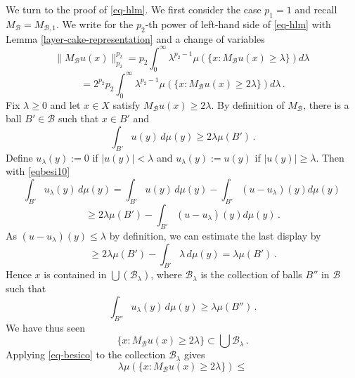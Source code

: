 {We turn to the proof of \eqref{eq-hlm}. We first consider the case $p_1=1$ and recall $M_{\mathcal{B}}=M_{\mathcal{B},1}$.
We write for the $p_2$-th power of left-hand side of \eqref{eq-hlm}
with Lemma \ref{layer-cake-representation}
and a change of variables
\begin{equation}
    \|M_{\mathcal{B}}u(x)\|_{p_2}^{p_2}
   =p_2\int _0^{\infty}
    \lambda^{p_2-1} \mu(\{x: M_{\mathcal{B}}u(x)\ge \lambda\}) d\lambda\,
\end{equation}
\begin{equation} \label{eqbesi11}
   =2^{p_2} p_2\int _0^{\infty}
    \lambda^{p_2-1} \mu(\{x: M_{\mathcal{B}}u(x)\ge 2\lambda\}) d\lambda\, .
\end{equation}
Fix $\lambda\ge 0$ and let $x\in X$ satisfy $M_{\mathcal{B}}u(x)\ge 2\lambda$. By definition of $M_{\mathcal{B}}$, there is a ball
$B'\in \mathcal{B}$ such that
$x\in B'$ and
\begin{equation}\label{eqbesi10}
\int_{B'} u(y)\, d\mu(y)\ge 2\lambda \mu({B'})   \, .
\end{equation}
Define
$u_\lambda(y):=0$ if $|u(y)|<\lambda$ and $u_\lambda(y):=u(y)$ if $|u(y)|\ge \lambda$.
Then with \eqref{eqbesi10}
\begin{equation}
\int_{B'} u_\lambda (y)\, d\mu(y)
=\int_{B'} u (y)\, d\mu(y)-
\int_{B'} (u-u_\lambda) (y) d\mu(y)\,
\end{equation}
\begin{equation}
\ge 2\lambda \mu({B'})-
\int_{B'} (u-u_\lambda) (y) d\mu(y)\, .
\end{equation}
As $(u-u_\lambda)(y)\le \lambda$
by definition, we can estimate the last display by
\begin{equation}
\ge 2\lambda \mu({B'})-
\int_{B'} \lambda \,  d\mu(y)
=\lambda \mu({B'})\, .
\end{equation}
Hence $x$ is contained in
$\bigcup(\mathcal{B}_\lambda)$,
where $\mathcal{B}_\lambda$
is the collection of balls $B''$ in $\mathcal{B}$ such that
\begin{equation}
    \int_{B''} u_\lambda (y)\, d\mu(y)\ge \lambda \mu(B'')\, .
\end{equation}
We have thus seen
\begin{equation}
    \{x: M_{\mathcal{B}}u(x)\ge 2\lambda\}\subset
    \bigcup \mathcal{B}_\lambda
\, .
\end{equation}
Applying  \eqref{eq-besico} to the  collection $\mathcal{B}_\lambda$
gives
\begin{equation}
    \lambda \mu(\{x: M_{\mathcal{B}}u(x)\ge 2\lambda\})\le

\end{equation}}
